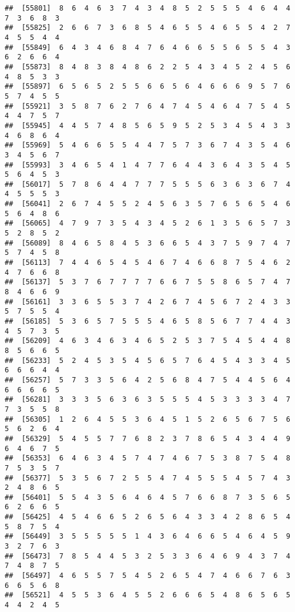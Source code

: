 \documentclass[
]{book}
\begin{document}
\begin{verbatim}
##  [55801]  8  6  4  6  3  7  4  3  4  8  5  2  5  5  5  4  6  4  4  7  3  6  8  3
##  [55825]  2  6  6  7  3  6  8  5  4  6  5  5  4  6  5  5  4  2  7  4  5  5  4  4
##  [55849]  6  4  3  4  6  8  4  7  6  4  6  6  5  5  6  5  5  4  3  6  2  6  6  4
##  [55873]  8  4  8  3  8  4  8  6  2  2  5  4  3  4  5  2  4  5  6  4  8  5  3  3
##  [55897]  6  5  6  5  2  5  5  6  6  5  6  4  6  6  6  9  5  7  6  5  7  4  5  5
##  [55921]  3  5  8  7  6  2  7  6  4  7  4  5  4  6  4  7  5  4  5  4  4  7  5  7
##  [55945]  4  4  5  7  4  8  5  6  5  9  5  2  5  3  4  5  4  3  3  4  6  8  6  4
##  [55969]  5  4  6  6  5  5  4  4  7  5  7  3  6  7  4  3  5  4  6  3  4  5  6  7
##  [55993]  3  4  6  5  4  1  4  7  7  6  4  4  3  6  4  3  5  4  5  5  6  4  5  3
##  [56017]  5  7  8  6  4  4  7  7  7  5  5  5  6  3  6  3  6  7  4  4  5  5  5  3
##  [56041]  2  6  7  4  5  5  2  4  5  6  3  5  7  6  5  6  5  4  6  5  6  4  8  6
##  [56065]  4  7  9  7  3  5  4  3  4  5  2  6  1  3  5  6  5  7  3  5  2  8  5  2
##  [56089]  8  4  6  5  8  4  5  3  6  6  5  4  3  7  5  9  7  4  7  5  7  4  5  8
##  [56113]  7  4  4  6  5  4  5  4  6  7  4  6  6  8  7  5  4  6  2  4  7  6  6  8
##  [56137]  5  3  7  6  7  7  7  7  6  6  7  5  5  8  6  5  7  4  7  8  4  6  6  9
##  [56161]  3  3  6  5  5  3  7  4  2  6  7  4  5  6  7  2  4  3  3  5  7  5  5  4
##  [56185]  5  3  6  5  7  5  5  5  4  6  5  8  5  6  7  7  4  4  3  4  5  7  3  5
##  [56209]  4  6  3  4  6  3  4  6  5  2  5  3  7  5  4  5  4  4  8  8  5  6  6  5
##  [56233]  5  2  4  5  3  5  4  5  6  5  7  6  4  5  4  3  3  4  5  6  6  6  4  4
##  [56257]  5  7  3  3  5  6  4  2  5  6  8  4  7  5  4  4  5  6  4  6  6  6  6  5
##  [56281]  3  3  3  5  6  3  6  3  5  5  5  4  5  3  3  3  3  4  7  7  3  5  5  8
##  [56305]  1  2  6  4  5  5  3  6  4  5  1  5  2  6  5  6  7  5  6  5  6  2  6  4
##  [56329]  5  4  5  5  7  7  6  8  2  3  7  8  6  5  4  3  4  4  9  6  4  6  7  5
##  [56353]  6  4  6  3  4  5  7  4  7  4  6  7  5  3  8  7  5  4  8  7  5  3  5  7
##  [56377]  5  3  5  6  7  2  5  5  4  7  4  5  5  5  4  5  7  4  3  2  4  8  6  5
##  [56401]  5  5  4  3  5  6  4  6  4  5  7  6  6  8  7  3  5  6  5  6  2  6  6  5
##  [56425]  4  5  4  6  6  5  2  6  5  6  4  3  3  4  2  8  6  5  4  5  8  7  5  4
##  [56449]  3  5  5  5  5  5  1  4  3  6  4  6  6  5  4  6  4  5  9  3  2  7  6  3
##  [56473]  7  8  5  4  4  5  3  2  5  3  3  6  4  6  9  4  3  7  4  7  4  8  7  5
##  [56497]  4  6  5  5  7  5  4  5  2  6  5  4  7  4  6  6  7  6  3  6  6  5  6  8
##  [56521]  4  5  5  3  6  4  5  5  2  6  6  6  5  4  8  6  5  6  5  4  4  2  4  5

\end{verbatim}
\end{document}

